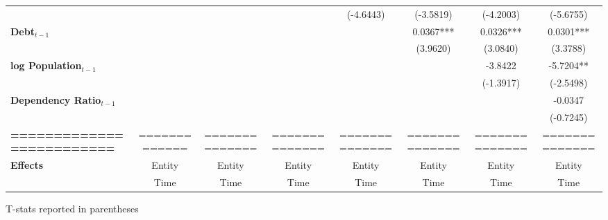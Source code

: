 \begin{center}
\begin{tabular}{lccccccc}
\textbf{ }                         &                   &                      &                           &     (-4.6443)      &    (-3.5819)    &         (-4.2003)         &          (-5.6755)            \\
\textbf{Debt$_{t-1}$}                &                   &                      &                           &                    &    0.0367***    &         0.0326***         &          0.0301***            \\
\textbf{ }                         &                   &                      &                           &                    &     (3.9620)    &          (3.0840)         &           (3.3788)            \\
\textbf{log Population$_{t-1}$}      &                   &                      &                           &                    &                 &          -3.8422          &          -5.7204**            \\
\textbf{ }                         &                   &                      &                           &                    &                 &         (-1.3917)         &          (-2.5498)            \\
\textbf{Dependency Ratio$_{t-1}$}   &                   &                      &                           &                    &                 &                           &           -0.0347             \\
\textbf{ }                         &                   &                      &                           &                    &                 &                           &          (-0.7245)            \\
\textbf{=========================} &   =============   &    ==============    &       ==============      &   ==============   &  ============== &       ==============      &        ==============         \\
\textbf{Effects}                   &       Entity      &        Entity        &           Entity          &       Entity       &      Entity     &           Entity          &            Entity             \\
\textbf{}                          &        Time       &         Time         &            Time           &        Time        &       Time      &            Time           &             Time              \\
\bottomrule
\end{tabular}
\end{center}

T-stats reported in parentheses